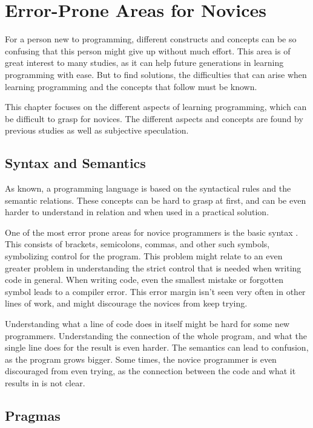 \chapter{Error-Prone Areas for Novices}
\label{chap:error-prone_areas_for_novices}
For a person new to programming, different constructs and concepts can be so confusing that this person might give up without much effort. This area is of great interest to many studies, as it can help future generations in learning programming with ease. But to find solutions, the difficulties that can arise when learning programming and the concepts that follow must be known.

This chapter focuses on the different aspects of learning programming, which can be difficult to grasp for novices. The different aspects and concepts are found by previous studies as well as subjective speculation.

\section{Syntax and Semantics}
As known, a programming language is based on the syntactical rules and the semantic relations. These concepts can be hard to grasp at first, and can be even harder to understand in relation and when used in a practical solution.

One of the most error prone areas for novice programmers is the basic syntax \cite{Garner05}. This consists of brackets, semicolons, commas, and other such symbols, symbolizing control for the program. This problem might relate to an even greater problem in understanding the strict control that is needed when writing code in general. When writing code, even the smallest mistake or forgotten symbol leads to a compiler error. This error margin isn't seen very often in other lines of work, and might discourage the novices from keep trying.

Understanding what a line of code does in itself might be hard for some new programmers. Understanding the connection of the whole program, and what the single line does for the result is even harder. The semantics can lead to confusion, as the program grows bigger. Some times, the novice programmer is even discouraged from even trying, as the connection between the code and what it results in is not clear.

\section{Pragmas}

